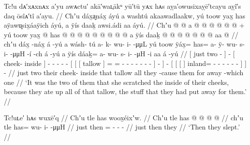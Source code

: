 \ex\label{ex:92-32-scratched-cheeks-because-ate-up-stuff-put-away}%
%
\begingl
	\glpreamble	Tc!u dᴀ′xᴀxnᴀx a′yu awᴀctu′ akā′waʟ̣ākᵘ yū′tū yᴀx hᴀs aỵa′owusixaỵē′tcayu aỵî′s daq ōsîᴀ′tî a′ayu. //
	\glpreamble	Chʼu dáx̱a̬náx̱ áyú a washtú akaawadlaakw, yú toow yax̱ has aÿawu̬six̱áaÿich áyú, a ÿís daaḵ awsi.ádi aa áyú. //
	\gla	{} Chʼu  @ {} {}  @ {}
		{} a  @ {} {}
		 @ {} @ {} @ {} @ {} @ {} +
		{} {} {} yú toow {}
			yax̱ @ has @  @ {} @ {} @ {} @ {} @ {} @ {} @ {} {}
			{} {}
		 @ {}
		{} {} {} a ÿís {} daaḵ @  @ {} @ {} @ {} @ {} @ {} @ {} {} aa {}
		 @ {} //
	\glb	{} chʼu dáx̱ -náx̱ {} á -yú
		{} a wásh- tú {}
		a- k- wu- i-  -μμL
		{} {} {} yú toow {}
			ÿáx̱= has= a- ÿ- wu- s- i-  -μμH -í {} -ch {}
		á -yú
		{} {} {} a ÿís {} dáaḵ= a- wu- s- i-  -μH -i {} aa {}
		á -yú //
	\glc	{}[ just two - {}]  -
		{}[  cheek- inside {}]
		- - - -  -
		{}[ {}[ {}[  tallow {}]
			= = - - - - -
				 - - {}] - {}]
		 -
		{}[ {}[ {}[   {}]
			inland= - - - -
				 - - {}]  {}]
		 - //
	\gld	{} just two {} {}  {}
		{} their cheek- inside {}
		 {} {} {} {} {}
		{} {} {} that tallow {}
			all they  {} {} {} {} {} {} {} {}
			-cause {}
		 {}
		{} {} {} them for {} away  {} {} {} {} {} -which {} one {}
		 {} //
	\glft	‘It was the two of them that she scratched the inside of their cheeks, because they ate up all of that tallow, the stuff that they had put away for them.’
		//
\endgl
\xe


\ex\label{ex:92-33-they-slept}%
%
\begingl
	\glpreamble	Tc!uʟe′ hᴀs wuxē′q //
	\glpreamble	Chʼu tle has woox̱éixʼw. //
	\gla	Chʼu tle has @  @ {} @ {} @ {} //
	\glb	chʼu tle has= wu- i-  -μμH //
	\glc	just then = - -  - //
	\gld	just then they  {} {} {} {} //
	\glft	‘Then they slept.’
		//
\endgl
\xe

